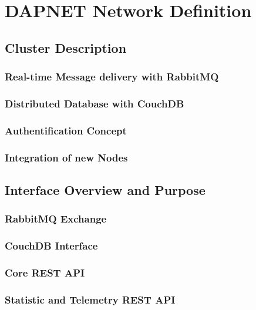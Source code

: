 \chapter{DAPNET Network Definition}


\section{Cluster Description}

\subsection{Real-time Message delivery with RabbitMQ}

\subsection{Distributed Database with CouchDB}

\subsection{Authentification Concept}

\subsection{Integration of new Nodes}


\section{Interface Overview and Purpose}

\subsection{RabbitMQ Exchange}

\subsection{CouchDB Interface}

\subsection{Core REST API}

\subsection{Statistic and Telemetry REST API}

